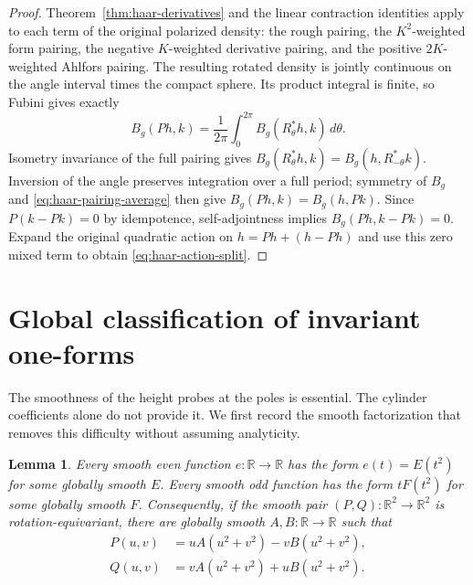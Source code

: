 \documentclass[11pt]{article}
\newtheorem{lemma}[theorem]{Lemma}
\newcommand{\R}{\mathbb R}
\begin{document}
\begin{proof}
Theorem~\ref{thm:haar-derivatives} and the linear contraction identities
apply to each term of the original polarized density: the rough pairing,
the $K^2$-weighted form pairing, the negative $K$-weighted derivative
pairing, and the positive $2K$-weighted Ahlfors pairing. The resulting
rotated density is jointly continuous on the angle interval times the
compact sphere. Its product integral is finite, so Fubini gives exactly
\begin{equation}\label{eq:haar-pairing-average}
 B_g(Ph,k)=\frac1{2\pi}\int_0^{2\pi}B_g(R_\theta^*h,k)\,d\theta.
\end{equation}
Isometry invariance of the full pairing gives
$B_g(R_\theta^*h,k)=B_g(h,R_{-\theta}^*k)$.
Inversion of the angle preserves integration over a full period;
symmetry of $B_g$ and \eqref{eq:haar-pairing-average} then give
$B_g(Ph,k)=B_g(h,Pk)$.
Since $P(k-Pk)=0$ by idempotence, self-adjointness implies
$B_g(Ph,k-Pk)=0$. Expand the original quadratic action on
$h=Ph+(h-Ph)$ and use this zero mixed term to obtain
\eqref{eq:haar-action-split}.
\end{proof}

\section{Global classification of invariant one-forms}

The smoothness of the height probes at the poles is essential. The cylinder
coefficients alone do not provide it. We first record the smooth factorization
that removes this difficulty without assuming analyticity.

\begin{lemma}\label{lem:parity-plane-factorization}
Every smooth even function $e:\R\to\R$ has the form $e(t)=E(t^2)$ for some
globally smooth $E$. Every smooth odd function has the form $tF(t^2)$ for
some globally smooth $F$. Consequently, if the smooth pair $(P,Q):\R^2\to\R^2$
is rotation-equivariant, there are globally smooth $A,B:\R\to\R$ such that
\begin{equation}\label{eq:plane-covector-factorization}
 \begin{split}
 P(u,v)&=uA(u^2+v^2)-vB(u^2+v^2),\\
 Q(u,v)&=vA(u^2+v^2)+uB(u^2+v^2).
 \end{split}
\end{equation}
\end{lemma}
\end{document}
